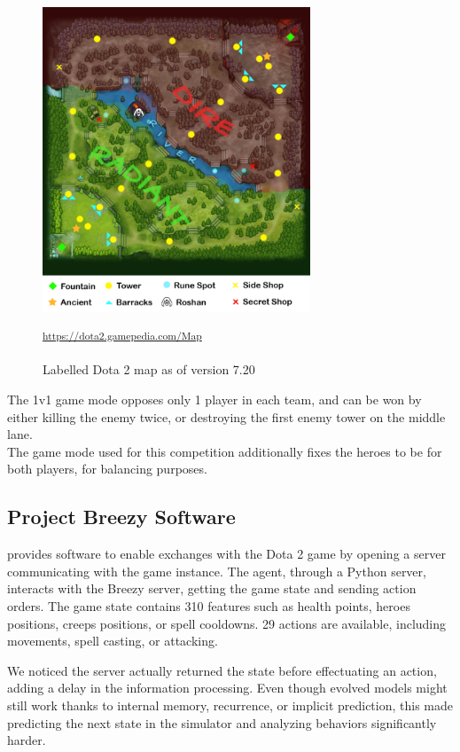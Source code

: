 \begin{figure}[H]
 \centering
 \captionsetup{justification=centering, margin=0.5cm}
 \includegraphics[width=8cm]{images/dota-map.png}
\caption{Labelled Dota 2 map as of version 7.20}
 \small\textsuperscript{\url{https://dota2.gamepedia.com/Map}}
 \label{fig:dota-2-map}
\end{figure}

The 1v1 game mode opposes only 1 player in each team, and can be won by either killing the enemy twice, or destroying the first enemy tower on the middle lane. \\
The game mode used for this competition additionally fixes the heroes to be  for both players, for balancing purposes.

\subsection{Project Breezy Software}
 provides software to enable exchanges with the Dota 2 game by opening a server communicating with the game instance. The agent, through a Python server, interacts with the Breezy server, getting the game state and sending action orders. The game state contains 310 features such as health points, heroes positions, creeps positions, or spell cooldowns. 29 actions are available, including movements, spell casting, or attacking.

We noticed the server actually returned the state before effectuating an action, adding a delay in the information processing. Even though evolved models might still work thanks to internal memory, recurrence, or implicit prediction, this made predicting the next state in the simulator and analyzing behaviors significantly harder. 

